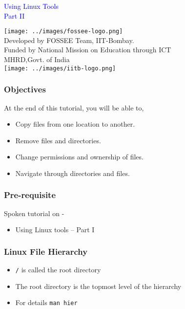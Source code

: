 \documentclass[12pt,compress]{beamer}
\begin{document}
\begin{frame}

\begin{center}
\vspace{12pt}
\textcolor{blue}{\huge Using Linux Tools\\Part II}
\end{center}
\vspace{18pt}
\begin{center}
\vspace{10pt}
\texttt{[image: ../images/fossee-logo.png]}\\
\vspace{5pt}
\scriptsize Developed by FOSSEE Team, IIT-Bombay. \\ 
\scriptsize Funded by National Mission on Education through ICT\\
\scriptsize  MHRD,Govt. of India\\
\texttt{[image: ../images/iitb-logo.png]}\\
\end{center}
\end{frame}
\begin{frame}
\frametitle{Objectives}
\label{sec-2}

At the end of this tutorial, you will be able to,
\begin{itemize}
\item Copy files from one location to another.
\item Remove files and directories.
\item Change permissions and ownership of files.
\item Navigate through directories and files.
\end{itemize}
\end{frame}

\begin{frame}
\frametitle{Pre-requisite}
\label{sec-3}

Spoken tutorial on -
\begin{itemize}
\item Using Linux tools -- Part I
\end{itemize}
\end{frame}


\begin{frame}
  \frametitle{Linux File Hierarchy}
  \begin{itemize}
  \item \texttt{/} is called the root directory
  \item The root directory is the topmost level of the hierarchy
  \item For details \texttt{man hier}
  \end{itemize}
\end{frame}
\end{document}
